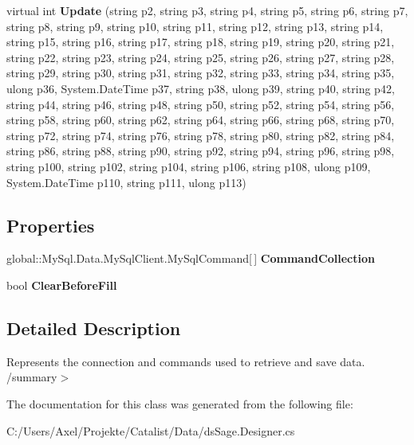 \begin{DoxyCompactItemize}
\item 
virtual int {\bfseries Update} (string p2, string p3, string p4, string p5, string p6, string p7, string p8, string p9, string p10, string p11, string p12, string p13, string p14, string p15, string p16, string p17, string p18, string p19, string p20, string p21, string p22, string p23, string p24, string p25, string p26, string p27, string p28, string p29, string p30, string p31, string p32, string p33, string p34, string p35, ulong p36, System.\+Date\+Time p37, string p38, ulong p39, string p40, string p42, string p44, string p46, string p48, string p50, string p52, string p54, string p56, string p58, string p60, string p62, string p64, string p66, string p68, string p70, string p72, string p74, string p76, string p78, string p80, string p82, string p84, string p86, string p88, string p90, string p92, string p94, string p96, string p98, string p100, string p102, string p104, string p106, string p108, ulong p109, System.\+Date\+Time p110, string p111, ulong p113)\hypertarget{class_products_1_1_data_1_1ds_sage_table_adapters_1_1ta_product_detail_a931a80eca444c835313321e12a9eecfb}{}\label{class_products_1_1_data_1_1ds_sage_table_adapters_1_1ta_product_detail_a931a80eca444c835313321e12a9eecfb}

\end{DoxyCompactItemize}
\subsection*{Properties}
\begin{DoxyCompactItemize}
\item 
global\+::\+My\+Sql.\+Data.\+My\+Sql\+Client.\+My\+Sql\+Command\mbox{[}$\,$\mbox{]} {\bfseries Command\+Collection}\hypertarget{class_products_1_1_data_1_1ds_sage_table_adapters_1_1ta_product_detail_aaa26740c213b257d7c1368e6d129a237}{}\label{class_products_1_1_data_1_1ds_sage_table_adapters_1_1ta_product_detail_aaa26740c213b257d7c1368e6d129a237}

\item 
bool {\bfseries Clear\+Before\+Fill}\hypertarget{class_products_1_1_data_1_1ds_sage_table_adapters_1_1ta_product_detail_ab6062134719543680132c55af3421850}{}\label{class_products_1_1_data_1_1ds_sage_table_adapters_1_1ta_product_detail_ab6062134719543680132c55af3421850}

\end{DoxyCompactItemize}


\subsection{Detailed Description}
Represents the connection and commands used to retrieve and save data. /summary$>$ 

The documentation for this class was generated from the following file\+:\begin{DoxyCompactItemize}
\item 
C\+:/\+Users/\+Axel/\+Projekte/\+Catalist/\+Data/ds\+Sage.\+Designer.\+cs\end{DoxyCompactItemize}
